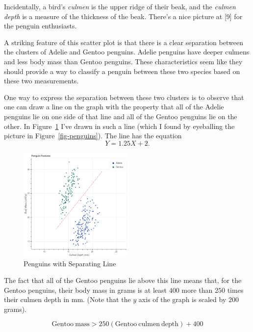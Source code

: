 \documentclass[
  11pt,
  letterpaper,
]{scrbook}
\theoremstyle{plain}
\theoremstyle{plain}
\theoremstyle{remark}
\begin{document}
Incidentally, a bird's \emph{culmen} is the upper ridge of their beak,
and the \emph{culmen depth} is a measure of the thickness of the beak.
There's a nice picture at {[}9{]} for the penguin enthusiasts.

A striking feature of this scatter plot is that there is a clear
separation between the clusters of Adelie and Gentoo penguins. Adelie
penguins have deeper culmens and less body mass than Gentoo penguins.
These characteristics seem like they should provide a way to classify a
penguin between these two species based on these two measurements.

One way to express the separation between these two clusters is to
observe that one can draw a line on the graph with the property that all
of the Adelie penguins lie on one side of that line and all of the
Gentoo penguins lie on the other. In Figure~\ref{fig-penguinsline} I've
drawn in such a line (which I found by eyeballing the picture in
Figure~\ref{fig-penguins}). The line has the equation \[
Y = 1.25X+2.
\]

\begin{figure}

{\centering \includegraphics[width=0.5\textwidth,height=\textheight]{chapters/img/penguins_with_line.png}

}

\caption{\label{fig-penguinsline}Penguins with Separating Line}

\end{figure}

The fact that all of the Gentoo penguins lie above this line means that,
for the Gentoo penguins, their body mass in grams is at least \(400\)
more than \(250\) times their culmen depth in mm. (Note that the \(y\)
axis of the graph is scaled by \(200\) grams).

\[
\mathrm{Gentoo\ mass}> 250(\mathrm{Gentoo\ culmen\ depth})+400
\]
\end{document}
